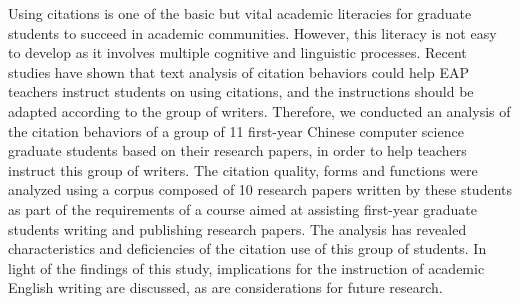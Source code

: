 \begin{eabstract}
  Using citations is one of the basic but vital academic literacies for graduate students to succeed in academic communities. However, this literacy is not easy to develop as it involves multiple cognitive and linguistic processes. Recent studies have shown that text analysis of citation behaviors could help EAP teachers instruct students on using citations, and the instructions should be adapted according to the group of writers. Therefore, we conducted an analysis of the citation behaviors of a group of 11 first-year Chinese computer science graduate students based on their research papers, in order to help teachers instruct this group of writers. The citation quality, forms and functions were analyzed using a corpus composed of 10 research papers written by these students as part of the requirements of a course aimed at assisting first-year graduate students writing and publishing research papers. The analysis has revealed characteristics and deficiencies of the citation use of this group of students.  In light of the findings of this study, implications for the instruction of academic English writing are discussed, as are considerations for future research.
\end{eabstract}

